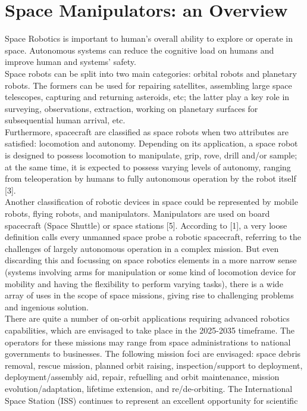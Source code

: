 \documentclass[a4paper,12pt,oneside]{report}
\begin{document}
\chapter{Space Manipulators: an Overview}
Space Robotics is important to human's overall ability to explore or operate in space. Autonomous systems can reduce the cognitive load on humans and improve human and systems' safety.\\
Space robots can be split into two main categories: orbital robots and planetary robots. The formers can be used for repairing satellites, assembling large space telescopes, capturing and returning asteroids, etc; the latter play a key role in surveying, observations, extraction, working on planetary surfaces for subsequential human arrival, etc.\\
Furthermore, spacecraft are classified as space robots when two attributes are satisfied: locomotion and autonomy. Depending on its application, a space robot is designed to possess locomotion to manipulate, grip, rove, drill and/or sample; at the same time, it is expected to possess varying levels of autonomy, ranging from teleoperation by humans to fully autonomous operation by the robot itself [3].\\
Another classification of robotic devices in space could be represented by mobile robots, flying robots, and manipulators. Manipulators are used on board spacecraft (Space Shuttle) or space stations [5].
According to [1], a very loose definition calls every unmanned space probe a robotic spacecraft, referring to the challenges of largely autonomous operation in a complex mission. But even discarding this and focussing on space robotics elements in a more narrow sense (systems involving arms for manipulation or some kind of locomotion device for mobility and having the flexibility to perform varying tasks), there is a wide array of uses in the scope of space missions, giving rise to challenging problems and ingenious solution.\\
There are quite a number of on-orbit applications requiring advanced robotics capabilities, which
are envisaged to take place in the 2025-2035 timeframe. The operators for these missions may
range from space administrations to national governments to businesses. The following mission
foci are envisaged: space debris removal, rescue mission, planned orbit raising,
inspection/support to deployment, deployment/assembly aid, repair, refuelling and orbit
maintenance, mission evolution/adaptation, lifetime extension, and re/de-orbiting. The
International Space Station (ISS) continues to represent an excellent opportunity for scientific
\end{document}
